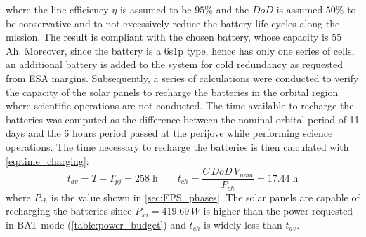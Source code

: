where the line efficiency $\eta$ is assumed to be $95\%$ and the $DoD$ is assumed $50\%$ to be conservative and to not excessively reduce the battery life cycles along the mission. The result is compliant with the chosen battery, whose capacity is $55$ Ah. \cite{batterie}
Moreover, since the battery is a 6s1p type, hence has only one series of cells, an additional battery is added to the system for cold redundancy as requested from ESA margins. \cite{esa_margins}
Subsequently, a series of calculations were conducted to verify the capacity of the solar panels to recharge the batteries in the orbital region where scientific operations are not conducted. The time available to recharge the batteries was computed as the difference between the nominal orbital period of 11 days and the 6 hours period passed at the perijove while performing science operations. The time necessary to recharge the batteries is then calculated with \autoref{eq:time_charging}:
\begin{equation}
    \label{eq:time_charging}
    t_{av} = T - T_{pj} = 258 \; \textrm{h} \qquad
    t_{ch}=\frac{C \, DoD \, V_{nom}}{P_{ch}}=17.44 \; \textrm{h}
\end{equation}
where $P_{ch}$ is the value shown in \autoref{sec:EPS_phases}. The solar panels are capable of recharging the batteries since $P_{sa}=419.69 \, W$ is higher than the power requested in BAT mode (\autoref{table:power_budget}) and $t_{ch}$ is widely less than $t_{av}$.